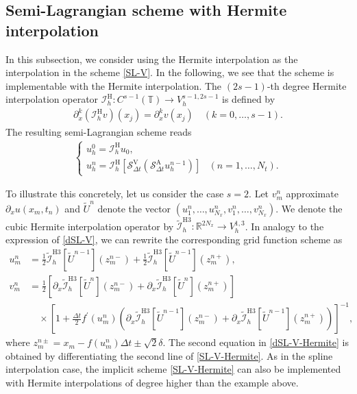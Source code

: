 \documentclass[10pt,a4paper,tbtags,leqno]{amsart}
\theoremstyle{definition}
\numberwithin{equation}{section}
\begin{document}
\subsection{Semi-Lagrangian scheme with Hermite interpolation} 

In this subsection, we consider using the Hermite interpolation as the interpolation in the scheme \eqref{SL-V}. In the following, we see that the scheme is implementable with the Hermite interpolation. The $(2s-1)$-th degree Hermite interpolation operator $\mathcal{I}_h^{\mathrm{H}}: C^{s-1}(\mathbb{T}) \to V_h^{s-1, 2s-1}$ is defined by 
\begin{align} 
  \partial_x^k (\mathcal{I}_h^{\mathrm{H}} v) (x_j) = \partial_x^k v(x_j) \quad (k = 0,\ldots,s - 1). 
\end{align} 
The resulting semi-Lagrangian scheme reads 
\begin{align} 
  \begin{cases} 
    u_h^0 = \mathcal{I}_h^{\mathrm{H}} u_0, & \\ u_h^{n} = \mathcal{I}_h^{\mathrm{H}} \left[\mathcal{S}_{\Delta t}^{\mathrm{V}} (\mathcal{S}_{\Delta t}^{\mathrm{A}} u_h^{n - 1})\right] & (n = 1, \ldots, N_t). 
  \end{cases} \label{SL-V-Hermite} 
\end{align} 

To illustrate this concretely, let us consider the case $s = 2$. Let $ v_m^n $ approximate $ \partial_x u (x_m, t_n) $ and $ \tilde{U}^n $ denote the vector $ (u_1^n, \ldots, u_{N_x}^n, v_1^n, \ldots, v_{N_x}^n) $. We denote the cubic Hermite interpolation operator by $ \tilde{\mathcal{I}}_h^{\mathrm{H3}}: \mathbb{R}^{2N_x} \to V_h^{1, 3} $. In analogy to the expression of \eqref{dSL-V}, we can rewrite the corresponding grid function scheme as 
\begin{align} 
  u_m^{n} & = \frac{1}{2} \tilde{\mathcal{I}}_h^{\mathrm{H3}} [\tilde{U}^{n - 1}] \left(z_m^{n-}\right) + \frac{1}{2} \tilde{\mathcal{I}}_h^{\mathrm{H3}} [\tilde{U}^{n - 1}] \left( z_m^{n+} \right), \\ 
  v_m^n & = \frac{1}{2} \left[\partial_x \tilde{\mathcal{I}}_h^{\mathrm{H3}} [\tilde{U}^n] (z_m^{n-}) + \partial_x \tilde{\mathcal{I}}_h^{\mathrm{H3}} [\tilde{U}^n] (z_m^{n+})\right] \\ 
  & \quad \times \left[ 1 + \frac{\Delta t}{2} f^\prime (u_m^n) \left(\partial_x \tilde{\mathcal{I}}_h^{\mathrm{H3}} [\tilde{U}^{n-1}] (z_m^{n-}) + \partial_x \tilde{\mathcal{I}}_h^{\mathrm{H3}} [\tilde{U}^{n-1}] (z_m^{n+})\right) \right]^{-1}, \label{dSL-V-Hermite} 
\end{align} 
where $ z_m^{n\pm} = x_m - f (u_m^n) \Delta t \pm \sqrt{2} \delta $. The second equation in \eqref{dSL-V-Hermite} is obtained by differentiating the second line of \eqref{SL-V-Hermite}. As in the spline interpolation case, the implicit scheme \eqref{SL-V-Hermite} can also be implemented with Hermite interpolations of degree higher than the example above. 
\end{document}
